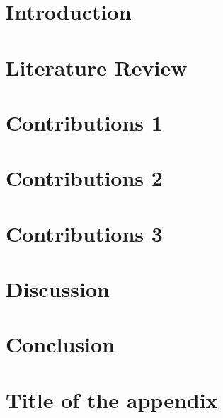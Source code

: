 \documentclass[12pt,twoside]{report}
\begin{document}












\tableofcontents

\listoffigures

\listoftables



\chapter{Introduction}


\chapter{Literature Review}


\chapter{Contributions 1}


\chapter{Contributions 2}


\chapter{Contributions 3}


\chapter{Discussion}


\chapter{Conclusion}



\appendix
\chapter{Title of the appendix}


\printbibliography
\end{document}
